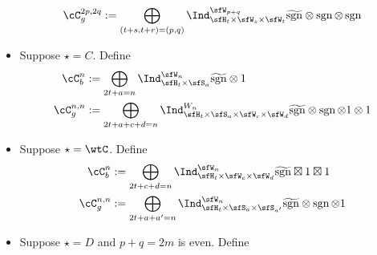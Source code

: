 \documentclass[12pt,a4paper]{amsart}
\newcommand{\Res}{\mathrm{Res}}
\newcommand{\sgn}{\operatorname{sgn}}
\numberwithin{equation}{section}
\theoremstyle{remark}
\def\Irr{\mathrm{Irr}}
\def\Cint#1{\Coh_{[#1]}}
\def\Coh{\mathrm{Coh}}
\def\hsgn{\widetilde{\mathrm{sgn}}}
\def\bsgn{\overline{\sgn}}
\begin{document}
\begin{itemize}
\[\begin{split}
          \cC_g^{2p,2q} %
          &:=\bigoplus_{\substack{(t+s,t+r)=(p,q)}} \Ind_{\sfH_{t} \times \sfW_s\times \sfW_t}^{\sfW_{p+q}}
          \hsgn \otimes \sgn \otimes \sgn \\
        \end{split}
        \]
  \item Suppose $\star=C$. Define
        \[
        \begin{split}
          \cC_b^{n} & :=\bigoplus_{\substack{2t+a=n}} %
          \Ind_{\sfH_{t} \times \sfS_a}^{\sfW_{n}}
          \hsgn\otimes 1 %
        \\
          \cC_g^{n,n} &:= \bigoplus_{2t+a+c+d=n}\Ind_{\sfH_{t} \times \sfS_{a} \times \sfW_c\times \sfW_d}^{W_{n}} \hsgn \otimes
          \sgn \otimes 1 \otimes 1\\
        \end{split}
        \]
  \item Suppose $\star=\wtC$. Define
        \[
        \begin{split}
          \cC_b^{n} & :=\bigoplus_{\substack{2t+c+d=n}} %
          \Ind_{\sfH_{t} \times \sfW_c\times \sfW_{d}}^{\sfW_{n}}
          \hsgn\boxtimes 1 \boxtimes 1 %
        \\
          \cC_g^{n,n} &:= \bigoplus_{2t+a+a'=n}\Ind_{\sfH_{t} \times \sfS_{a} \times \sfS_{a'}}^{\sfW_{n}} \hsgn \otimes
          \sgn \otimes 1 \\
        \end{split}
        \]
  \item Suppose $\star=D$ and $p+q=2m$ is even. Define
        \[
        \begin{split}

\end{split}\]
\end{itemize}
\end{document}
